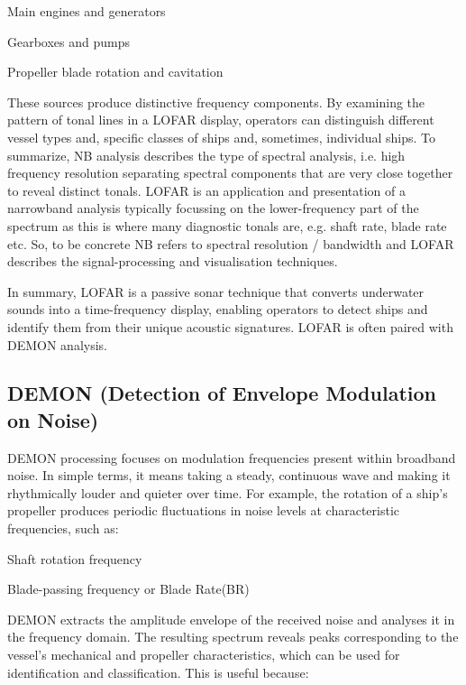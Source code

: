 \begin{compactitem}
    \item Main engines and generators
    \item Gearboxes and pumps
    \item Propeller blade rotation and cavitation
\end{compactitem}

These sources produce distinctive frequency components. By examining the pattern of tonal lines in a LOFAR display, operators can distinguish different vessel types and, specific classes of ships and, sometimes, individual ships. To summarize, NB analysis describes the type of spectral analysis, i.e. high frequency resolution separating spectral components that are very close together to reveal distinct tonals. LOFAR is an application and presentation of a narrowband analysis typically focussing on the lower-frequency part of the spectrum as this is where many diagnostic tonals are, e.g. shaft rate, blade rate etc. So, to be concrete NB refers to spectral resolution / bandwidth and LOFAR describes the signal-processing and visualisation techniques.

\begin{learnpoint}
    In summary, LOFAR is a passive sonar technique that converts underwater sounds into a time-frequency display, enabling operators to detect ships and identify them from their unique acoustic signatures. LOFAR is often paired with DEMON analysis.
\end{learnpoint}

\subsection{DEMON (Detection of Envelope Modulation on Noise)}

DEMON processing focuses on modulation frequencies present within broadband noise. In simple terms, it means taking a steady, continuous wave and making it rhythmically louder and quieter over time. For example, the rotation of a ship's propeller produces periodic fluctuations in noise levels at characteristic frequencies, such as:

\begin{compactitem}
    \item Shaft rotation frequency
    \item Blade-passing frequency or Blade Rate(BR)  
\end{compactitem}

DEMON extracts the amplitude envelope of the received noise and analyses it in the frequency domain. The resulting spectrum reveals peaks corresponding to the vessel's mechanical and propeller characteristics, which can be used for identification and classification. This is useful because:

